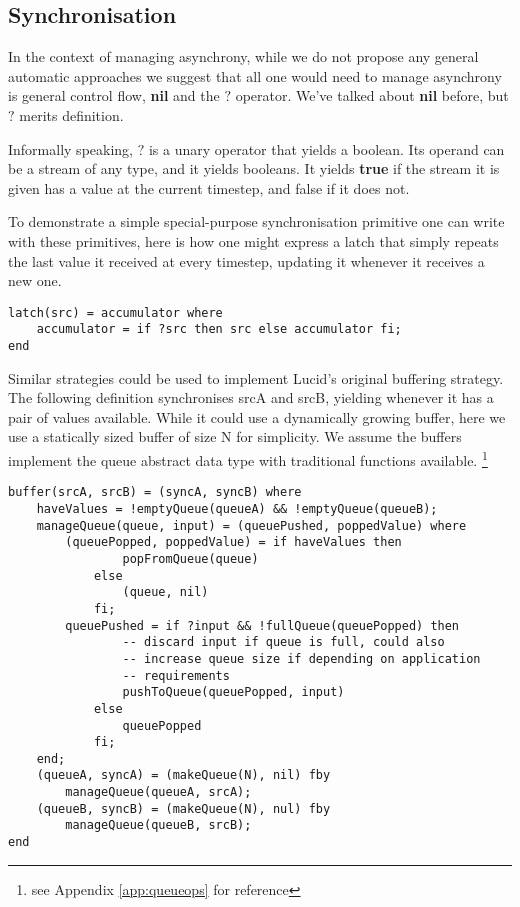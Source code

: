\documentclass{scrartcl}
\begin{document}
    \subsection{Synchronisation}

    In the context of managing asynchrony, while we do not propose any general automatic approaches we suggest that all one would need to manage asynchrony is general control flow, \textbf{nil} and the $?$ operator. We've talked about \textbf{nil} before, but $?$ merits definition.

    Informally speaking, $?$ is a unary operator that yields a boolean. Its operand can be a stream of any type, and it yields booleans. It yields \textbf{true} if the stream it is given has a value at the current timestep, and false if it does not.

    To demonstrate a simple special-purpose synchronisation primitive one can write with these primitives, here is how one might express a latch that simply repeats the last value it received at every timestep, updating it whenever it receives a new one.

    \begin{lstlisting}
latch(src) = accumulator where
    accumulator = if ?src then src else accumulator fi;
end
    \end{lstlisting}

    Similar strategies could be used to implement Lucid's original buffering strategy. The following definition synchronises srcA and srcB, yielding whenever it has a pair of values available. While it could use a dynamically growing buffer, here we use a statically sized buffer of size N for simplicity. We assume the buffers implement the queue abstract data type with traditional functions available.
    \footnote{see Appendix \ref{app:queueops} for reference}

    \begin{lstlisting}
buffer(srcA, srcB) = (syncA, syncB) where
    haveValues = !emptyQueue(queueA) && !emptyQueue(queueB);
    manageQueue(queue, input) = (queuePushed, poppedValue) where
        (queuePopped, poppedValue) = if haveValues then
                popFromQueue(queue)
            else
                (queue, nil)
            fi;
        queuePushed = if ?input && !fullQueue(queuePopped) then
                -- discard input if queue is full, could also
                -- increase queue size if depending on application
                -- requirements
                pushToQueue(queuePopped, input)
            else
                queuePopped
            fi;
    end;
    (queueA, syncA) = (makeQueue(N), nil) fby
        manageQueue(queueA, srcA);
    (queueB, syncB) = (makeQueue(N), nul) fby
        manageQueue(queueB, srcB);
end
    \end{lstlisting}
\end{document}
